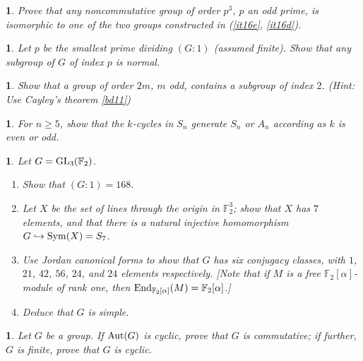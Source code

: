 \documentclass[a4paper,11pt,final,openany]{memoir}%
\newtheorem{exercise}[Y]{}
\theoremstyle{nonumberplain}
\begin{document}
\begin{exercise}
\label{x21} Prove that any noncommutative group of order $p^{3}$, $p$ an odd
prime, is isomorphic to one of the two groups constructed in (\ref{it16e},
\ref{it16d}).

\end{exercise}

\begin{exercise}
\label{x22} Let $p$ be the smallest prime dividing $(G:1)$ (assumed finite).
Show that any subgroup of $G$ of index $p$ is normal.

\end{exercise}

\begin{exercise}
\label{x23} Show that a group of order $2m$, $m$ odd, contains a subgroup of
index $2$. (Hint: Use Cayley's theorem \ref{bd11})

\end{exercise}

\begin{exercise}
\label{x23a}For $n\geq5$, show that the $k$-cycles in $S_{n}$ generate $S_{n}$
or $A_{n}$ according as $k$ is even or odd.

\end{exercise}

\begin{exercise}
\label{x24} Let $G=\operatorname{GL}_{3}(\mathbb{F}_{2})$.

\begin{enumerate}
\item Show that $(G:1)=168$.

\item Let $X$ be the set of lines through the origin in $\mathbb{F}_{2}^{3}$;
show that $X$ has $7$ elements, and that there is a natural injective
homomorphism $G\hookrightarrow\operatorname{Sym}(X)=S_{7}$.

\item Use Jordan canonical forms to show that $G$ has six conjugacy classes,
with $1$, $21$, $42$, $56$, $24$, and $24$ elements respectively. [Note that
if $M$ is a free $\mathbb{F}_{2}[\alpha]$-module of rank one, then
$\operatorname{End}_{\mathbb{F}_{2}[\alpha]}(M)=\mathbb{F}_{2}[\alpha]$.]

\item Deduce that $G$ is simple.
\end{enumerate}

\end{exercise}

\begin{exercise}
\label{x25} Let $G$ be a group. If $\operatorname{Aut}(G)$ is cyclic, prove that $G$ is
commutative; if further, $G$ is finite, prove that $G$ is cyclic.
\end{exercise}
\end{document}
